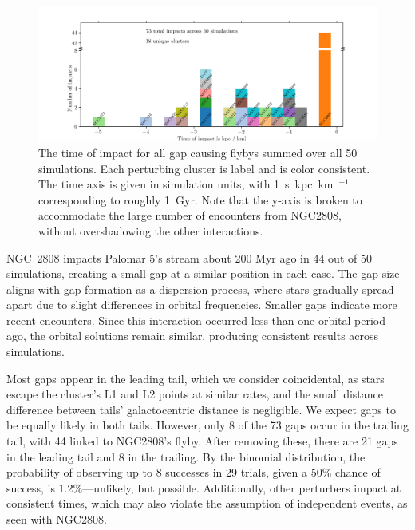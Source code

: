 \documentclass[draft]{aa}
\begin{document}
    \begin{figure}
      \centering
      \includegraphics[width=\linewidth]{histogram_impact_time.png}
      \caption{The time of impact for all gap causing flybys summed over all 50 simulations. Each perturbing cluster is label and is color consistent. The time axis is given in simulation units, with 1~s~kpc~km~$^{-1}$ corresponding to roughly 1~Gyr. Note that the y-axis is broken to accommodate the large number of encounters from NGC2808, without overshadowing the other interactions.}
      \label{fig:histogram_impact_time}
      \end{figure}



    NGC~2808 impacts Palomar 5's stream about 200 Myr ago in 44 out of 50 simulations, creating a small gap at a similar position in each case. The gap size aligns with gap formation as a dispersion process, where stars gradually spread apart due to slight differences in orbital frequencies. Smaller gaps indicate more recent encounters. Since this interaction occurred less than one orbital period ago, the orbital solutions remain similar, producing consistent results across simulations.


    Most gaps appear in the leading tail, which we consider coincidental, as stars escape the cluster's L1 and L2 points at similar rates, and the small distance difference between tails' galactocentric distance is negligible. We expect gaps to be equally likely in both tails. However, only 8 of the 73 gaps occur in the trailing tail, with 44 linked to NGC2808's flyby. After removing these, there are 21 gaps in the leading tail and 8 in the trailing. By the binomial distribution, the probability of observing up to 8 successes in 29 trials, given a 50\% chance of success, is 1.2\%—unlikely, but possible. Additionally, other perturbers impact at consistent times, which may also violate the assumption of independent events, as seen with NGC2808.
\end{document}

